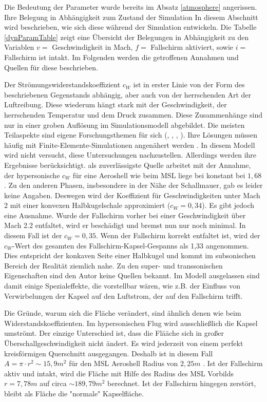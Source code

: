 Die Bedeutung der Parameter wurde bereits im Absatz \ref{atmosphere} angerissen. Ihre Belegung in Abhängigkeit zum Zustand der Simulation In diesem Abschnitt wird beschrieben, wie sich diese während der Simulation entwickeln. Die Tabelle \ref{dynParamTable} zeigt eine Übersicht der Belegungen in Abhängigkeit zu den Variablen $v = $ Geschwindigkeit in Mach, $f =$ Fallschirm aktiviert, sowie $i =$ Fallschirm ist intakt. Im Folgenden werden die getroffenen Annahmen und Quellen für diese beschrieben.



Der Strömungswiderstandskoeffizient $c_W$ ist in erster Linie von der Form des beschriebenen Gegenstands abhängig, aber auch von der herrschenden Art der Luftreibung. Diese wiederum hängt stark mit der Geschwindigkeit, der herrschenden Temperatur und dem Druck zusammen. Diese Zusammenhänge sind nur in einer groben Auflösung im Simulationsmodell abgebildet. Die meisten Teilaspekte sind eigene Forschungsthemen für sich (\cite{Blanchard1980}, \cite{Edquist2009}, \cite{Theisinger2009}, \cite{Yamada2009}). Ihre Lösungen müssen häufig mit Finite-Elemente-Simulationen angenähert werden \cite{Edquist2009}. In diesem Modell wird nicht versucht, diese Untersuchungen nachzustellen. Allerdings werden ihre Ergebnisse berücksichtigt. \cite{Wells2000} als zuverlässigste Quelle arbeitet mit der Annahme, der hypersonische $c_W$ für eine Aeroshell wie beim MSL liege bei konstant bei $1,68$. Zu den anderen Phasen, insbesondere in der Nähe der Schallmauer, gab es leider keine Angaben. Deswegen wird der Koeffizient für Geschwindigkeiten unter Mach 2 mit einer konvexen Halbkugelschale approximiert ($c_W = 0,34$). Es gibt jedoch eine Ausnahme. Wurde der Fallschirm vorher bei einer Geschwindigkeit über Mach 2.2 \cite{Way2007} \cite{Edquist2009} entfaltet, wird er beschädigt und bremst nun nur noch minimal. In diesem Fall ist der $c_W = 0,35$. Wenn der Fallschirm korrekt entfaltet ist, wird der $c_W$-Wert des gesamten des Fallschirm-Kapsel-Gespanns als 1,33 angenommen. Dies entspricht der konkaven Seite einer Halbkugel und kommt im subsonischen Bereich der Realität ziemlich nahe. Zu den super- und transsonischen Eigenschaften sind den Autor keine Quellen bekannt. Im Modell ausgelassen sind damit einige Spezialeffekte, die vorstellbar wären, wie z.B. der Einfluss von Verwirbelungen der Kapsel auf den Luftstrom, der auf den Fallschirm trifft.

Die Gründe, warum sich die Fläche verändert, sind ähnlich denen wie beim Widerstandskoeffizienten. Im hypersonischen Flug wird ausschließlich die Kapsel umströmt. Der einzige Unterschied ist, dass die Flääche sich in großer Überschallgeschwindigkeit nicht ändert. Es wird jederzeit von einem perfekt kreisförmigen Querschnitt ausgegangen. Deshalb ist in diesem Fall $ A = \pi \cdot r^2 \sim 15,9m^2$ für den MSL Aeroshell Radius von $2,25m$ \cite{Edquist2009}. Ist der Fallschirm aktiv und intakt, wird die Fläche mit Hilfe des Radius des MSL Vorbilds $ r = 7,78m $ \cite{NASA/JPL2009} auf circa $\sim 189,79m^2$ berechnet. Ist der Fallschirm hingegen zerstört, bleibt als Fläche die "normale" Kapselfläche.

